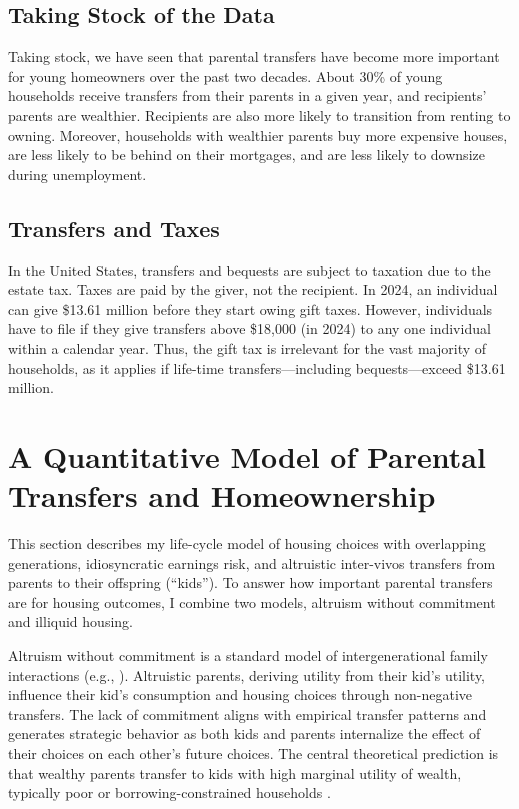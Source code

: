 \documentclass[12pt]{article}
\begin{document}
\subsection{Taking Stock of the Data}
Taking stock, we have seen that parental transfers have become more important for young homeowners over the past two decades. About 30\% of young households receive transfers from their parents in a given year, and recipients' parents are wealthier. Recipients are also more likely to transition from renting to owning. Moreover, households with wealthier parents buy more expensive houses, are less likely to be behind on their mortgages, and are less likely to downsize during unemployment. 

\subsection{Transfers and Taxes}
In the United States, transfers and bequests are subject to taxation due to the estate tax. Taxes are paid by the giver, not the recipient. In 2024, an individual can give \$13.61 million before they start owing gift taxes. However, individuals have to file if they give transfers above \$18,000 (in 2024) to any one individual within a calendar year. Thus, the gift tax is irrelevant for the vast majority of households, as it applies if life-time transfers---including bequests---exceed \$13.61 million.


\section{A Quantitative Model of Parental Transfers and Homeownership}\label{sec:model}
This section describes my life-cycle model of housing choices with overlapping generations, idiosyncratic earnings risk, and altruistic inter-vivos transfers from parents to their offspring (``kids''). To answer how important parental transfers are for housing outcomes, I combine two models, altruism without commitment and illiquid housing. 

Altruism without commitment is a standard model of intergenerational family interactions (e.g., \cite{Altonji1997a,Barczyk2018}). Altruistic parents, deriving utility from their kid's utility, influence their kid's consumption and housing choices through non-negative transfers. The lack of commitment aligns with empirical transfer patterns and generates strategic behavior as both kids and parents internalize the effect of their choices on each other's future choices. The central theoretical prediction is that wealthy parents transfer to kids with high marginal utility of wealth, typically poor or borrowing-constrained households \citep{Chu2020,Barczyk2020}.
\end{document}
